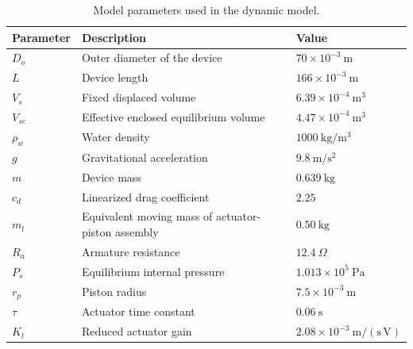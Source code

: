 ﻿\documentclass[subscriptcorrection,upint,varvw,barcolor=Goldenrod3,mathalfa=cal=euler,balance,hyphenate,french,pdf-a]{asmejour}
\begin{document}
\begin{table}[t]
    \caption{Model parameters used in the dynamic model.}
    \label{tab:model_parameters}
    \centering
    \begin{tabular}{lll}
        \hline
        Parameter & Description & Value \\
        \hline
        $D_o$ & Outer diameter of the device & $70\times10^{-3}\ \mathrm{m}$ \\
        $L$ & Device length & $166\times10^{-3}\ \mathrm{m}$ \\
        $V_s$ & Fixed displaced volume & $6.39\times10^{-4}\ \mathrm{m}^3$ \\
        $V_{se}$ & Effective enclosed equilibrium volume & $4.47\times10^{-4}\ \mathrm{m}^3$ \\
        $\rho_w$ & Water density & $1000\ \mathrm{kg/m^3}$ \\
        $g$ & Gravitational acceleration & $9.8\ \mathrm{m/s^2}$ \\
        $m$ & Device mass & $0.639\ \mathrm{kg}$ \\
        $c_d$ & Linearized drag coefficient & $2.25$ \\
        $m_l$ & Equivalent moving mass of actuator-piston assembly & $0.50\ \mathrm{kg}$ \\
        $R_a$ & Armature resistance & $12.4\ \Omega$ \\
        $P_s$ & Equilibrium internal pressure & $1.013\times10^5\ \mathrm{Pa}$ \\
        $r_p$ & Piston radius & $7.5\times10^{-3}\ \mathrm{m}$ \\
        $\tau$ & Actuator time constant & $0.06\ \mathrm{s}$ \\
        $K_l$ & Reduced actuator gain & $2.08\times10^{-3}\ \mathrm{m/(s\,V)}$ \\
        \hline
    \end{tabular}
\end{table}
\end{document}
